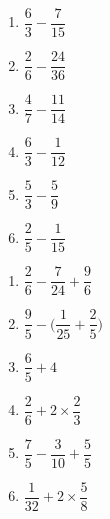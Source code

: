 \documentclass[11pt]{article}
\begin{document}
\begin{exercice}[0]
\begin{multicols}{3}
\begin{enumerate}
\item $\dfrac{6}{3}-\dfrac{7}{15}$
\item $\dfrac{2}{6}-\dfrac{24}{36}$
\item $\dfrac{4}{7}-\dfrac{11}{14}$
\item $\dfrac{6}{3}-\dfrac{1}{12}$
\item $\dfrac{5}{3}-\dfrac{5}{9}$
\item $\dfrac{2}{5}-\dfrac{1}{15}$
\end{enumerate}
\end{multicols}
\end{exercice}


\begin{exercice}[0]
\begin{multicols}{3}
\begin{enumerate}[itemsep=2em]
\item $\dfrac{2}{6}-\dfrac{7}{24}+\dfrac{9}{6}$
\item $\dfrac{9}{5}- \Big(\dfrac{1}{25} + \dfrac{2}{5}\Big)$
\item $\dfrac{6}{5} + 4$
\item $\dfrac{2}{6}+ 2 \times \dfrac{2}{3}$
\item $\dfrac{7}{5}-\dfrac{3}{10}+\dfrac{5}{5}$
\item $\dfrac{1}{32}+ 2 \times \dfrac{5}{8}$
\end{enumerate}
\end{multicols}
\end{exercice}
\end{document}
